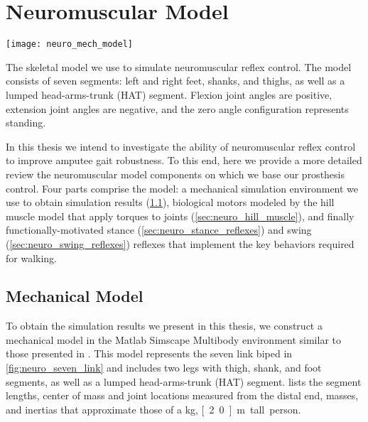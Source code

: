 \chapter{Neuromuscular Model}\label{sec:neuro_model}
\begin{marginfigure}
    \centering
    \texttt{[image: neuro\_mech\_model]}
    \caption{The skeletal model we use to simulate neuromuscular reflex control.
    The model consists of seven segments: left and right feet, shanks, and
    thighs, as well as a lumped head-arms-trunk (HAT) segment. Flexion joint
    angles are positive, extension joint angles are negative, and the zero
    angle configuration represents standing.}
    \label{fig:neuro_seven_link}
\end{marginfigure}

In this thesis we intend to investigate the ability of neuromuscular reflex
control to improve amputee gait robustness. To this end, here we provide a more
detailed review the neuromuscular model components on which we base our
prosthesis control. Four parts comprise the model: a mechanical simulation
environment we use to obtain simulation results (\cref{sec:neuro_mech_model}),
biological motors modeled by the hill muscle model that apply torques to joints
(\cref{sec:neuro_hill_muscle}), and finally functionally-motivated stance
(\cref{sec:neuro_stance_reflexes}) and swing (\cref{sec:neuro_swing_reflexes})
reflexes that implement the key behaviors required for walking.

\section{Mechanical Model}\label{sec:neuro_mech_model}

To obtain the simulation results we present in this thesis, we construct a
mechanical model in the Matlab Simscape Multibody environment similar to those
presented in \citet{geyer2010muscle, song2015neural}. This model represents the
seven link biped in \cref{fig:neuro_seven_link} and includes two legs with
thigh, shank, and foot segments, as well as a lumped head-arms-trunk (HAT)
segment.  lists the segment lengths, center of mass
and joint locations measured from the distal end, masses, and inertias that
approximate those of a \unit[80]{kg}, \unit[2.0]{m} tall person.

